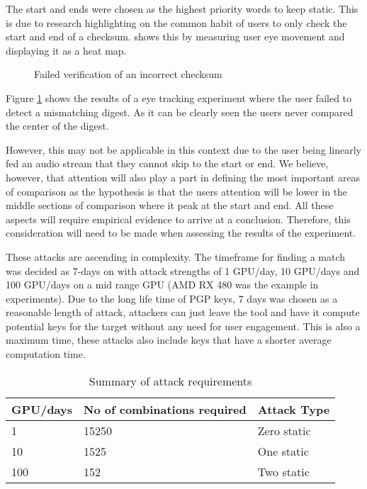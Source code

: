 The start and ends were chosen as the highest priority words to keep static. This is due to research highlighting on the common habit of users to only check the start and end of a checksum. \cite{cherubini2018towards} shows this by measuring user eye movement and displaying it as a heat map.

\begin{figure}[h!]
    \centering
    \caption{Failed verification of an incorrect checksum\cite{cherubini2018towards}}
    \label{fig:heatMap}
\end{figure}

Figure \ref{fig:heatMap} shows the results of a eye tracking experiment where the user failed to detect a mismatching digest. As it can be clearly seen the users never compared the center of the digest. 

However, this may not be applicable in this context due to the user being linearly fed an audio stream that they cannot skip to the start or end. We believe, however, that attention will also play a part in defining the most important areas of comparison as the hypothesis is that the users attention will be lower in the middle sections of comparison where it peak at the start and end. All these aspects will require empirical evidence to arrive at a conclusion. Therefore, this consideration will need to be made when assessing the results of the experiment.

These attacks are ascending in complexity. The timeframe for finding a match was decided as 7-days on with attack strengths of 1 GPU/day, 10 GPU/days and 100 GPU/days on a mid range GPU (AMD RX 480 was the example in experiments). Due to the long life time of PGP keys, 7 days was chosen as a reasonable length of attack, attackers can just leave the tool and have it compute potential keys for the target without any need for user engagement. This is also a maximum time, these attacks also include keys that have a shorter average computation time.


\begin{table}[h!]
    \centering
    \begin{tabular}{lll}
        GPU/days & No of combinations required & Attack Type \\
        \hline
        1       & 15250   & Zero static\\
        10      & 1525    & One static\\
        100     & 152     & Two static\\        
    \end{tabular}
    \caption{Summary of attack requirements}
    \label{tab:attackReq}
\end{table}

